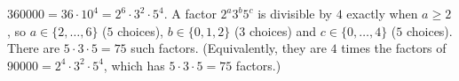 $360000=36\cdot10^4=2^6\cdot3^2\cdot5^4$. A factor $2^a3^b5^c$ is divisible by $4$ exactly when $a\ge2$, so $a\in\{2,\dots,6\}$ ($5$ choices), $b\in\{0,1,2\}$ ($3$ choices) and $c\in\{0,\dots,4\}$ ($5$ choices). There are $5\cdot3\cdot5=\boxed{75}$ such factors. (Equivalently, they are $4$ times the factors of $90000=2^4\cdot3^2\cdot5^4$, which has $5\cdot3\cdot5=75$ factors.)
